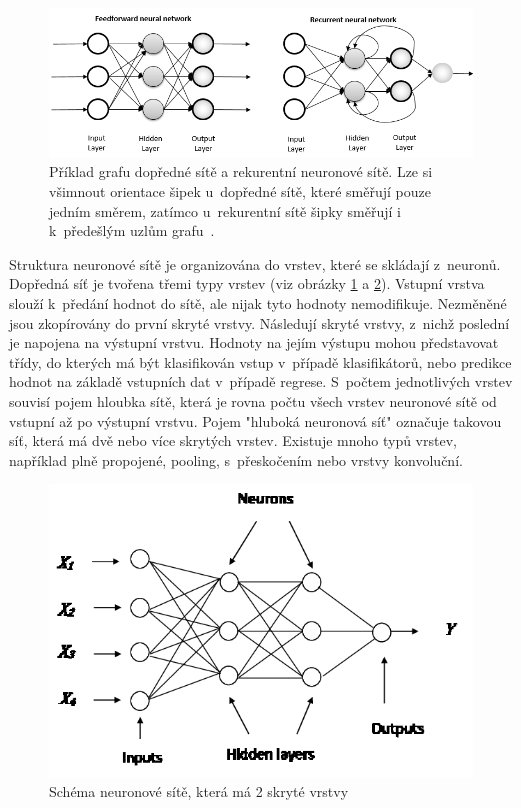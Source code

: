 \begin{figure}[H]
    \centering
    \includegraphics[scale=0.5]{obrazky-figures/feedforward_vs_recurrent.png}
    \caption{\label{fig:netcomparison}Příklad grafu dopředné sítě a rekurentní neuronové sítě. Lze si všimnout orientace šipek u~dopředné sítě, které směřují pouze jedním směrem, zatímco u~rekurentní sítě šipky směřují i k~předešlým uzlům grafu~\cite{FFandRecNN}.}
\end{figure}

Struktura neuronové sítě je organizována do vrstev, které se skládají z~neuronů. Dopředná síť je tvořena třemi typy vrstev (viz obrázky \ref{fig:netcomparison} a \ref{fig:mlp}). Vstupní vrstva slouží k~předání hodnot do sítě, ale nijak tyto hodnoty nemodifikuje. Nezměněné jsou zkopírovány do první skryté vrstvy. Následují skryté vrstvy, z~nichž poslední je napojena na výstupní vrstvu. Hodnoty na jejím výstupu mohou představovat třídy, do kterých má být klasifikován vstup v~případě klasifikátorů, nebo predikce hodnot na základě vstupních dat v~případě regrese. S~počtem jednotlivých vrstev souvisí pojem hloubka sítě, která je rovna počtu všech vrstev neuronové sítě od vstupní až po výstupní vrstvu. Pojem  "hluboká neuronová síť" označuje takovou síť, která má dvě nebo více skrytých vrstev. Existuje mnoho typů vrstev, například plně propojené, pooling, s~přeskočením nebo vrstvy konvoluční.

\begin{figure}[H]
    \centering
    \includegraphics[scale=1.3]{obrazky-figures/mlp.png}
    \caption{\label{fig:mlp}Schéma neuronové sítě, která má 2 skryté vrstvy}
\end{figure}



